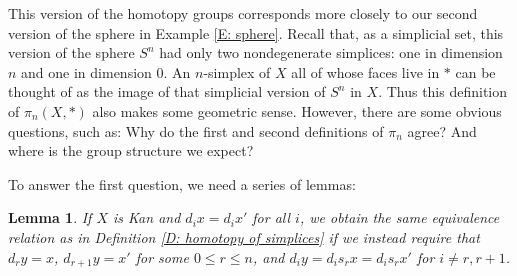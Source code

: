 \documentclass[12pt]{article}
\theoremstyle{plain}
\newtheorem{lemma}[theorem]{Lemma}
\theoremstyle{definition}
\theoremstyle{remark}
\begin{document}
This version of the homotopy groups corresponds more closely to our second version of the sphere in Example \ref{E: sphere}. Recall that, as a simplicial set, this version of the sphere $S^n$ had only two nondegenerate simplices: one in dimension $n$ and one in dimension $0$. An $n$-simplex of $X$ all of whose faces live in $*$ can be thought of as the image of that simplicial version of $S^n$ in $X$. Thus this definition of $\pi_n(X,*)$ also makes some geometric sense. However, there are some obvious questions, such as:  Why do the first and second definitions of $\pi_n$ agree? And where is the group structure we expect?

To answer the first question, we need a series of lemmas:


\begin{lemma}\label{L: alt homotopy}
If $X$ is Kan and $d_ix=d_ix'$ for all $i$, we obtain the same equivalence relation as in Definition \ref{D: homotopy of simplices} if we instead require that $d_ry=x$, $d_{r+1}y=x'$ for some $0\leq r\leq n$,  and $d_iy=d_is_rx=d_is_rx'$ for  $i\neq r, r+1$.
\end{lemma}

\end{document}
